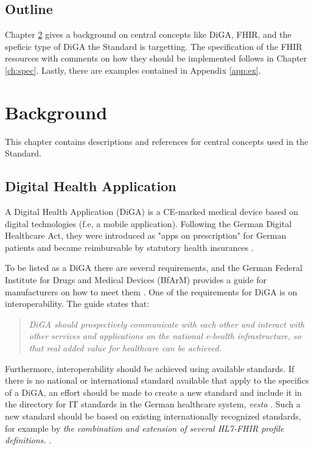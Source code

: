 \documentclass[12px]{report}
\begin{document}
\section{Outline}
Chapter \ref{ch:bg} gives a background on central concepts like DiGA, FHIR, and the speficic type of DiGA the Standard is targetting. The specification of the FHIR resources with comments on how they should be implemented follows in Chapter \ref{ch:spec}.
Lastly, there are examples contained in Appendix \ref{app:ex}.


\chapter{Background}
\label{ch:bg}

This chapter contains descriptions and references for central concepts used in the Standard.

\section{Digital Health Application}
A Digital Health Application (DiGA) is a CE-marked medical device based on digital technologies (f.e, a mobile application). Following the German Digital Healthcare Act, they were introduced as "apps on prescription" for German patients and became reimbursable by statutory health insurances \cite{diga}.

To be listed as a DiGA there are several requirements, and the German Federal Institute for Drugs and Medical Devices (BfArM) provides a guide for manufacturers on how to meet them \cite{guide}.
One of the requirements for DiGA is on interoperability. The guide \cite[p.51]{guide} states that:

\begin{quotation}
    \noindent \textit{DiGA should prospectively communicate with each other and interact with other services and applications on the national e-health infrastructure, so that real added value for healthcare can be achieved.}
\end{quotation}

Furthermore, interoperability should be achieved using available standards. If there is no national or international standard available that apply to the specifics of a DiGA, an effort should be made to create a new standard and include it in the directory for IT standards in the German healthcare system, \textit{vesta} \cite{vesta}.
Such a new standard should be based on existing internationally recognized standards, for example by \textit{the combination and extension of several HL7-FHIR profile definitions.} \cite[p.53-54]{guide}.
\end{document}
